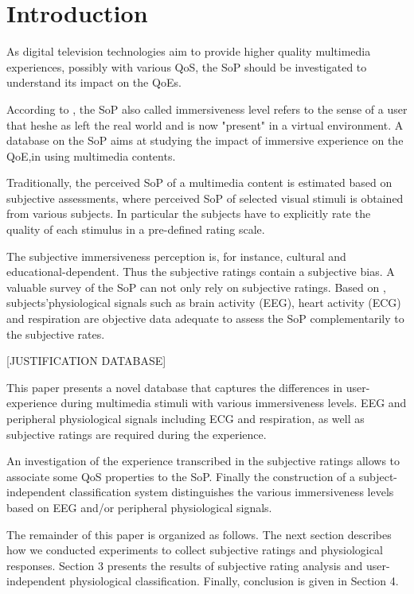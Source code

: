 \section{Introduction}
As digital television technologies aim to provide higher quality multimedia experiences, possibly with various \ac{QoS}, the \ac{SoP} should be investigated to understand its impact on the \acp{QoE}.

According to \cite{SS}, the \ac{SoP} also called immersiveness level refers to the sense of a user that he\/she as left the real world and is now "present" in a virtual environment. A database on the \ac{SoP} aims at studying the impact of immersive experience on the \ac{QoE},in using multimedia contents.

Traditionally, the perceived \ac{SoP} of a multimedia content is estimated based on subjective assessments, where perceived \ac{SoP} of selected visual stimuli is obtained from various subjects. In particular the subjects have to explicitly rate the quality of each stimulus in a pre-defined rating scale. 

The subjective immersiveness perception is, for instance, cultural and educational-dependent. Thus the subjective ratings contain a subjective bias. A valuable survey of the \ac{SoP} can not only rely on subjective ratings. Based on \cite{2Dvs3D}, subjects'physiological signals such as brain activity (\ac{EEG}), heart activity (\ac{ECG}) and respiration are objective data adequate to assess the \ac{SoP} complementarily to the subjective rates.

[JUSTIFICATION DATABASE]

This paper presents a novel database that captures the differences in user-experience during multimedia stimuli with various immersiveness levels. \ac{EEG} and peripheral physiological signals including \ac{ECG} and respiration, as well as subjective ratings are required during the experience.

An investigation of the experience transcribed in the subjective ratings allows to associate some \ac{QoS} properties to the \ac{SoP}. Finally the construction of a subject-independent classification system distinguishes the various immersiveness levels based on \ac{EEG} and/or peripheral physiological signals.

The remainder of this paper is organized as follows.
The next section describes how we conducted experiments to collect subjective ratings and physiological responses. Section 3 presents the results of subjective rating analysis and user-independent physiological classification. Finally, conclusion is given in Section 4.